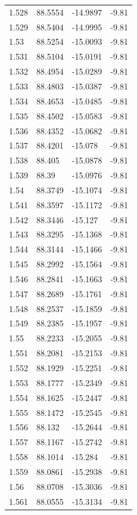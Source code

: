 \begin{tabular}{llll}
1.528 & 88.5554 & -14.9897 & -9.81 \\
1.529 & 88.5404 & -14.9995 & -9.81 \\
1.53 & 88.5254 & -15.0093 & -9.81 \\
1.531 & 88.5104 & -15.0191 & -9.81 \\
1.532 & 88.4954 & -15.0289 & -9.81 \\
1.533 & 88.4803 & -15.0387 & -9.81 \\
1.534 & 88.4653 & -15.0485 & -9.81 \\
1.535 & 88.4502 & -15.0583 & -9.81 \\
1.536 & 88.4352 & -15.0682 & -9.81 \\
1.537 & 88.4201 & -15.078 & -9.81 \\
1.538 & 88.405 & -15.0878 & -9.81 \\
1.539 & 88.39 & -15.0976 & -9.81 \\
1.54 & 88.3749 & -15.1074 & -9.81 \\
1.541 & 88.3597 & -15.1172 & -9.81 \\
1.542 & 88.3446 & -15.127 & -9.81 \\
1.543 & 88.3295 & -15.1368 & -9.81 \\
1.544 & 88.3144 & -15.1466 & -9.81 \\
1.545 & 88.2992 & -15.1564 & -9.81 \\
1.546 & 88.2841 & -15.1663 & -9.81 \\
1.547 & 88.2689 & -15.1761 & -9.81 \\
1.548 & 88.2537 & -15.1859 & -9.81 \\
1.549 & 88.2385 & -15.1957 & -9.81 \\
1.55 & 88.2233 & -15.2055 & -9.81 \\
1.551 & 88.2081 & -15.2153 & -9.81 \\
1.552 & 88.1929 & -15.2251 & -9.81 \\
1.553 & 88.1777 & -15.2349 & -9.81 \\
1.554 & 88.1625 & -15.2447 & -9.81 \\
1.555 & 88.1472 & -15.2545 & -9.81 \\
1.556 & 88.132 & -15.2644 & -9.81 \\
1.557 & 88.1167 & -15.2742 & -9.81 \\
1.558 & 88.1014 & -15.284 & -9.81 \\
1.559 & 88.0861 & -15.2938 & -9.81 \\
1.56 & 88.0708 & -15.3036 & -9.81 \\
1.561 & 88.0555 & -15.3134 & -9.81 \\

\end{tabular}
